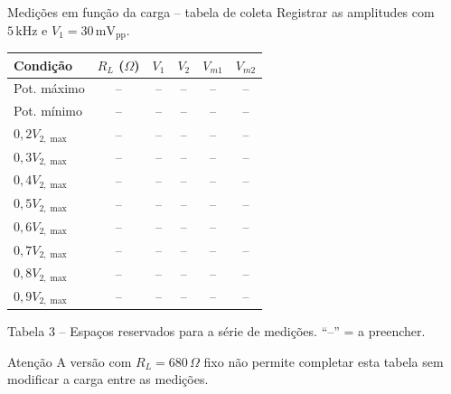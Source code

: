 \documentclass[aspectratio=169,11pt]{beamer}
\begin{document}
\begin{frame}{Medições em função da carga -- tabela de coleta}
  \scriptsize
  Registrar as amplitudes com $5\,\mathrm{kHz}$ e $V_1=30\,\mathrm{mV_{pp}}$.
  \vspace{0.14cm}\par
  \begin{center}
    \renewcommand{\arraystretch}{1.09}
    \begin{tabular}{lccccc}
      \toprule
      \textbf{Condição} & $R_L$ ($\Omega$) & $V_1$ & $V_2$ & $V_{m1}$ & $V_{m2}$\\
      \midrule
      Pot. máximo  & -- & -- & -- & -- & --\\
      Pot. mínimo  & -- & -- & -- & -- & --\\
      $0{,}2V_{2,\max}$ & -- & -- & -- & -- & --\\
      $0{,}3V_{2,\max}$ & -- & -- & -- & -- & --\\
      $0{,}4V_{2,\max}$ & -- & -- & -- & -- & --\\
      $0{,}5V_{2,\max}$ & -- & -- & -- & -- & --\\
      $0{,}6V_{2,\max}$ & -- & -- & -- & -- & --\\
      $0{,}7V_{2,\max}$ & -- & -- & -- & -- & --\\
      $0{,}8V_{2,\max}$ & -- & -- & -- & -- & --\\
      $0{,}9V_{2,\max}$ & -- & -- & -- & -- & --\\
      \bottomrule
    \end{tabular}
    \vspace{0.10cm}\par
    {\scriptsize Tabela 3 -- Espaços reservados para a série de medições. ``--'' = a preencher.}
  \end{center}
  \vspace{-0.08cm}
  \begin{alertblock}{Atenção}
    \scriptsize A versão com $R_L=680\,\Omega$ fixo não permite completar esta tabela sem
    modificar a carga entre as medições.
  \end{alertblock}
\end{frame}


\end{document}
